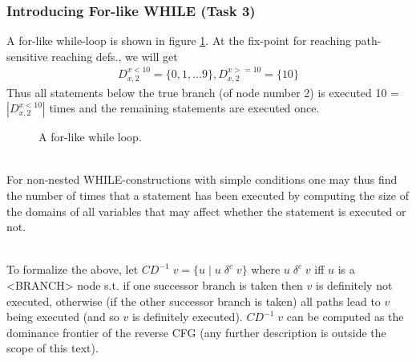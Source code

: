 \documentclass[a4paper]{article}
\newcommand{\NL}[0]{ \hfill\\\noindent }
\begin{document}

\subsubsection{Introducing For-like WHILE (Task 3)}
A for-like while-loop is shown in figure \ref{forwhile}. At the fix-point for reaching path-sensitive reaching defs., we will get
\begin{align*}
D_{x,2}^{x < 10} = \{0,1,\ldots 9 \}, D_{x,2}^{x >= 10} = \{ 10 \}
\end{align*}
\noindent
Thus all statements below the true branch (of node number 2) is executed 10 = $|D_{x,2}^{x < 10}|$ times and the remaining statements are executed once.
\begin{figure}[ht!]
	\centering	
	\scalebox{.6}{}
	\caption{ A for-like while loop. }
	\label{forwhile}
\end{figure}
\noindent

\NL
For non-nested WHILE-constructions with simple conditions one may thus find the number of times that a statement has been executed by computing the size of the domains of all variables that may affect whether the statement is executed or not. 

\NL
To formalize the above, let $CD^{-1}\;v = \{ u\;|\;u\;\delta^c\;v  \}$ where $u\;\delta^c\;v$ iff $u$ is a <BRANCH> node s.t. if one successor branch is taken then $v$ is definitely not executed, otherwise (if the other successor branch is taken) all paths lead to $v$ being executed (and so $v$ is definitely executed). $CD^{-1}\;v$ can be computed as the dominance frontier of the reverse CFG (any further description is outside the scope of this text).
\end{document}

